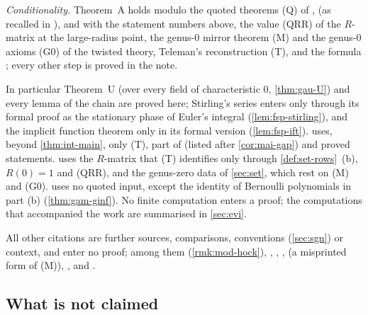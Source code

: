 \emph{Conditionality.} Theorem~A holds modulo the quoted theorems (Q) of \cite{Eynard:2007kz}, \cite{DuninBarkowski:2012bw} (as recalled in \cite{Dunin-Barkowski:2015caa}), \cite{ABDKS25} and \cite{PPZ15} with the statement numbers above, the value (QRR) of the $R$-matrix at the large-radius point, the genus-$0$ mirror theorem (M) and the genus-$0$ axioms (G0) of the twisted theory, Teleman's reconstruction (T), and the formula \cite[(1.7)]{AC96}; every other step is proved in the note.

In particular Theorem~U (over every field of characteristic $0$, \cref{thm:gau-U}) and every lemma of the chain are proved here; Stirling's series enters only through its formal proof as the stationary phase of Euler's integral (\cref{lem:fsp-stirling}), and the implicit function theorem only in its formal version (\cref{lem:fsp-ift}).  uses, beyond \cref{thm:int-main}, only (T), part of \cite{PPZ15} (listed after \cref{cor:mai-gap}) and proved statements.  uses the $R$-matrix that (T) identifies only through \cref{def:set-rows}~(b), $R(0)=1$ and (QRR), and the genus-zero data of \cref{sec:set}, which rest on (M) and (G0).  uses no quoted input, except the identity \cite[24.4.1]{DLMF} of Bernoulli polynomials in part (b) (\cref{thm:gam-ginf}). No finite computation enters a proof; the computations that accompanied the work are summarised in \cref{sec:evi}.

All other citations are further sources, comparisons, conventions (\cref{sec:sgn}) or context, and enter no proof; among them \cite[Corollary~1.2]{Hock25} (\cref{rmk:mod-hock}), \cite[Theorem~4.4, (4-23)--(4-24); Corollary~4.1, (4-26)--(4-29); (A-25); Theorem~4.7, (4-30); (5-15)]{Eynard:2007kz}, \cite[(26)]{LP20}, \cite[Theorem~2]{MR2276766}, \cite[Corollary~11.7]{MR1408320} (a misprinted form of (M)), \cite[Props.~6.1--6.2]{GR19}, \cite[\S2.4.3, (17); \S2.4.4, (19)--(20)]{LP20} and \cite{CGYZ26}.

\subsection{What is not claimed}
\label{sec:int-notclaimed}

